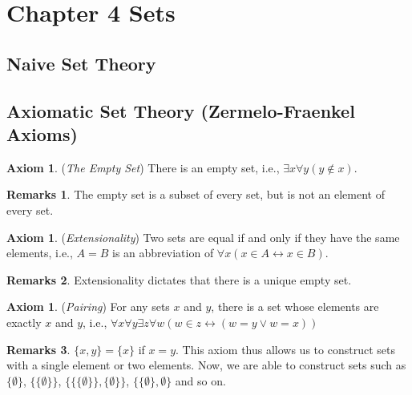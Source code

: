 \documentclass[14pt]{article}
\theoremstyle{definition}
\newtheorem*{remark}{Remarks}
\newtheorem{axiom}[definition]{Axiom}
\begin{document}
\section{Chapter 4 Sets}
\subsection{Naive Set Theory}

\subsection{Axiomatic Set Theory (Zermelo-Fraenkel Axioms)}
\begin{axiom}
    (\textit{The Empty Set}) There is an empty set, i.e., $\exists x \forall y(y\notin x)$.
\end{axiom}
\begin{remark}
    The empty set is a subset of every set, but is not an element of every set.
\end{remark}

\vspace{2mm}

\begin{axiom}
    (\textit{Extensionality}) Two sets are equal if and only if they have the same elements, i.e., $A=B$ is an abbreviation of $\forall x(x\in A \leftrightarrow x\in B )$.
\end{axiom}
\begin{remark}
    Extensionality dictates that there is a unique empty set.
\end{remark}

\vspace{2mm}

\begin{axiom}
    (\textit{Pairing}) For any sets $x$ and $y$, there is a set whose elements are exactly $x$ and $y$, i.e.,  $\forall x\forall y\exists z\forall w(w\in z \leftrightarrow (w=y\lor w=x))$
\end{axiom}
\begin{remark}
    $\lbrace x,y \rbrace =\lbrace x\rbrace$ if $x=y$. This axiom thus allows us to construct sets with a single element or two elements. Now, we are able to construct sets such as $\{\emptyset\}$, $\big\{ \{\emptyset\}\big\}$, $\Big\{\big\{ \{\emptyset\}\big\}, \{\emptyset\}\Big\}$, $\big\{\{\emptyset\}, \emptyset\big\}$ and so on.
\end{remark}

\vspace{2mm}
\end{document}

